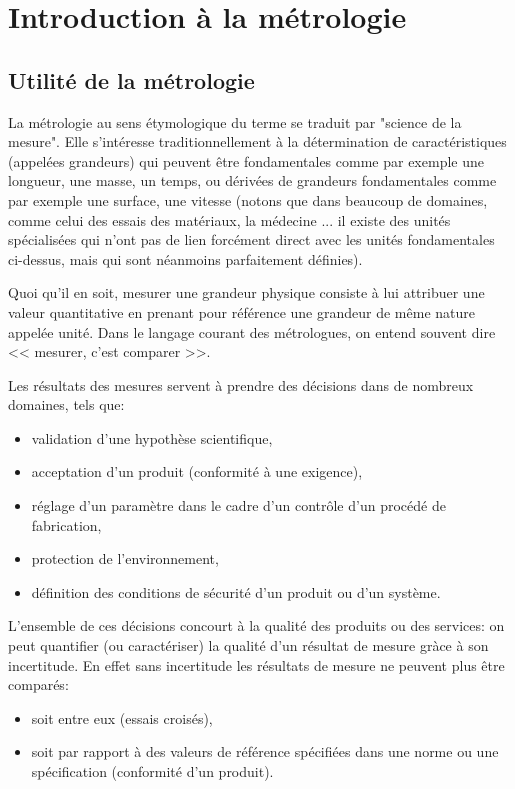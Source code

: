 \documentclass[main.tex]{subfiles}
\begin{document}
\chapter{Introduction à la métrologie}
\label{chap:introduction-metrology}

\section{Utilité de la métrologie}

La métrologie au sens étymologique du terme se traduit par "science de la mesure". Elle s'intéresse traditionnellement à la détermination de caractéristiques (appelées grandeurs) qui peuvent être fondamentales comme par exemple une longueur, une masse, un temps, ou dérivées de grandeurs fondamentales comme par exemple une surface, une vitesse (notons que dans beaucoup de domaines, comme celui des essais des matériaux, la médecine ... il existe des unités spécialisées qui n'ont pas de lien forcément direct avec les unités fondamentales ci-dessus, mais qui sont néanmoins parfaitement définies).

Quoi qu'il en soit, mesurer une grandeur physique consiste à lui attribuer une valeur quantitative en prenant pour référence une grandeur de même nature appelée unité. Dans le langage courant des métrologues, on entend souvent dire << mesurer, c'est comparer >>.

Les résultats des mesures servent à prendre des décisions dans de nombreux domaines, tels que:
\begin{itemize}\itemsep1pt
\renewcommand{\labelitemi}{$\bullet$}
\item validation d'une hypothèse scientifique,
\item acceptation d'un produit (conformité à une exigence),
\item réglage d'un paramètre dans le cadre d'un contrôle d'un procédé de fabrication,
\item protection de l'environnement,
\item définition des conditions de sécurité d'un produit ou d'un système.
\end{itemize}
L'ensemble de ces décisions concourt à la qualité des produits ou des services: on peut quantifier (ou caractériser) la qualité d'un résultat de mesure gràce à son incertitude.  
En effet sans incertitude les résultats de mesure ne peuvent plus être comparés:
\begin{itemize}\itemsep1pt
\renewcommand{\labelitemi}{$\bullet$}
\item soit entre eux (essais croisés),
\item soit par rapport à des valeurs de référence spécifiées dans une norme ou une spécification (conformité d'un produit).
\end{itemize}
\end{document}
